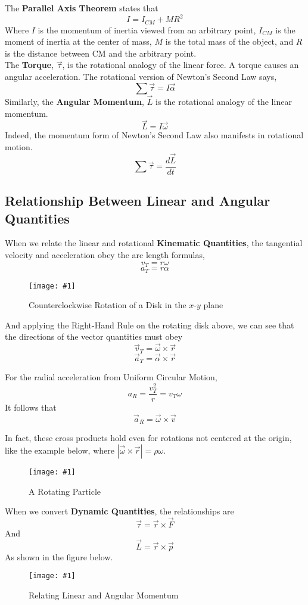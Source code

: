 \documentclass[11pt]{article}
\newcommand{\fig}[4]{
    \begin{figure}[H]
        \centering
        \texttt{[image: \#1]}
        \caption{#2}
        \label{exp4fit}
    \end{figure}
}
\theoremstyle{gangnamstyle}{\newtheorem{definition}{Definition}[]}
\theoremstyle{gangnamstyle}{\newtheorem{example}{Example}[]}
\theoremstyle{gangnamstyle}{\newtheorem{problem}{Problem}[]}
\begin{document}
The \textbf{Parallel Axis Theorem} states that
\[ I = I_{CM} + MR^2 \]
Where $I$ is the momentum of inertia viewed from an arbitrary point, $I_{CM}$ is the moment of inertia at the center of mass, $M$ is the total mass of the object, and $R$ is the distance between CM and the arbitrary point. \\

The \textbf{Torque}, $\Vec{\tau}$, is the rotational analogy of the linear force. A torque causes an angular acceleration. The rotational version of Newton's Second Law says, 
\[ \sum\Vec{\tau} = I \Vec{\alpha} \]
Similarly, the \textbf{Angular Momentum}, $\Vec{L}$ is the rotational analogy of the linear momentum. 
\[ \Vec{L} = I\Vec{\omega} \]
Indeed, the momentum form of Newton's Second Law also manifests in rotational motion. 
\[ \sum\Vec{\tau} = \frac{d\Vec{L}}{dt} \]

\pagebreak

\subsection{Relationship Between Linear and Angular Quantities}

When we relate the linear and rotational \textbf{Kinematic Quantities}, the tangential velocity and acceleration obey the arc length formulas, 
\[ v_T = r\omega \]
\[ a_T = r\alpha \]

\fig{figs/0718/conversions.jpeg}{Counterclockwise Rotation of a Disk in the $x$-$y$ plane}{0.15}{0}

And applying the Right-Hand Rule on the rotating disk above, we can see that the directions of the vector quantities must obey
\[ \Vec{v}_T = \Vec{\omega} \times \Vec{r} \]
\[ \Vec{a}_T = \Vec{\alpha} \times \Vec{r} \]

For the radial acceleration from Uniform Circular Motion, 
\[ a_R = \frac{v_T^2}{r} = v_T\omega \]
It follows that 
\[ \Vec{a}_R = \Vec{\omega} \times \Vec{v} \]

\pagebreak

In fact, these cross products hold even for rotations not centered at the origin, like the example below, where $|\Vec{\omega} \times \Vec{r}| = \rho \omega$. 
\fig{figs/0718/particle.png}{A Rotating Particle}{0.6}{0}

When we convert \textbf{Dynamic Quantities}, the relationships are
\[ \Vec{\tau} = \Vec{r} \times \Vec{F} \]
And
\[ \Vec{L} = \Vec{r} \times \Vec{p} \]
As shown in the figure below. 

\fig{figs/0718/momentum.png}{Relating Linear and Angular Momentum}{0.4}{0}
\end{document}
